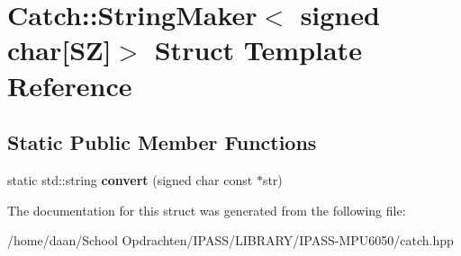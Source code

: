 \hypertarget{structCatch_1_1StringMaker_3_01signed_01char[SZ]_4}{}\section{Catch\+:\+:String\+Maker$<$ signed char\mbox{[}SZ\mbox{]}$>$ Struct Template Reference}
\label{structCatch_1_1StringMaker_3_01signed_01char[SZ]_4}
\subsection*{Static Public Member Functions}
\begin{DoxyCompactItemize}
\item 
\mbox{\label{structCatch_1_1StringMaker_3_01signed_01char[SZ]_4_a23ac689cc79dbcfe9b1765fe9e25690e}} 
static std\+::string {\bfseries convert} (signed char const $\ast$str)
\end{DoxyCompactItemize}


The documentation for this struct was generated from the following file\+:\begin{DoxyCompactItemize}
\item 
/home/daan/\+School Opdrachten/\+I\+P\+A\+S\+S/\+L\+I\+B\+R\+A\+R\+Y/\+I\+P\+A\+S\+S-\/\+M\+P\+U6050/catch.\+hpp\end{DoxyCompactItemize}
